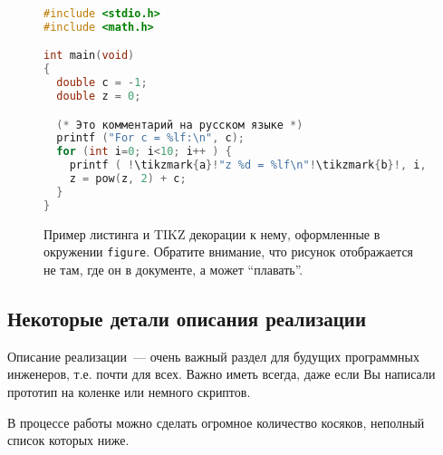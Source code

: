 \begin{figure}
    \begin{lstlisting}[escapechar=!, basicstyle=\ttfamily, language=c, keepspaces=true]
#include <stdio.h>
#include <math.h>

int main(void)
{
  double c = -1;
  double z = 0;

  (* Это комментарий на русском языке *)
  printf ("For c = %lf:\n", c);
  for (int i=0; i<10; i++ ) {
    printf ( !\tikzmark{a}!"z %d = %lf\n"!\tikzmark{b}!, i, z);
    z = pow(z, 2) + c;
  }
}
\end{lstlisting}

    \caption{Пример листинга и \textsc{TIKZ} декорации к нему, оформленные в окружении \texttt{figure}. Обратите внимание, что рисунок отображается не там, где он в документе, а может \enquote{плавать}.}
\end{figure}

\subsection{Некоторые детали описания реализации}
Описание реализации~--- очень важный раздел для будущих программных инженеров, т.е. почти для всех. Важно иметь всегда, даже если Вы написали прототип на коленке или немного скриптов.

В процессе работы можно сделать огромное количество косяков, неполный список которых ниже.


